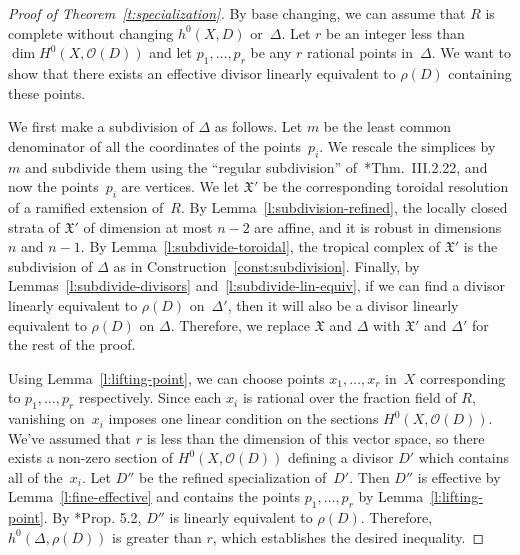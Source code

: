 \documentclass[11pt]{amsart}
\theoremstyle{definition}
\newcommand{\X}{\mathfrak X}
\begin{document}
\begin{proof}[Proof of Theorem~\ref{t:specialization}]
By base changing, we can assume that $R$ is complete without changing
$h^0(X, D)$ or~$\Delta$. Let $r$ be an integer less than $\dim
H^0(X, \mathcal O(D))$ and let $p_1, \ldots, p_r$ be any $r$ rational
points in~$\Delta$. We want to show that there exists an effective divisor
linearly equivalent to $\rho(D)$ containing these points.

We first make a subdivision of $\Delta$ as follows. Let $m$ be the least common
denominator of all the coordinates of the points~$p_i$. We rescale the simplices
by~$m$ and subdivide them using the ``regular subdivision''
of~\cite{kkmsd}*{Thm.~III.2.22}, and now the points~$p_i$ are vertices. We let
$\X'$ be the corresponding toroidal resolution of a ramified extension of~$R$.
By Lemma~\ref{l:subdivision-refined}, the locally closed strata of $\X'$ of
dimension at most $n-2$ are affine, and it is robust in dimensions $n$ and
$n-1$. By Lemma~\ref{l:subdivide-toroidal}, the tropical complex of $\X'$ is the
subdivision of $\Delta$ as in Construction~\ref{const:subdivision}. Finally, by
Lemmas~\ref{l:subdivide-divisors} and~\ref{l:subdivide-lin-equiv}, if we can
find a divisor linearly equivalent to $\rho(D)$ on~$\Delta'$, then it will also
be a divisor linearly equivalent to $\rho(D)$ on $\Delta$. Therefore, we replace
$\X$ and $\Delta$ with $\X'$ and $\Delta'$ for the rest of the proof.

Using Lemma~\ref{l:lifting-point}, we can choose points $x_1, \ldots, x_r$
in~$X$ corresponding to $p_1, \ldots, p_r$ respectively. Since each $x_i$ is
rational over the fraction field of $R$, vanishing on~$x_i$ imposes one linear
condition on the sections $H^0(X, \mathcal O(D))$. We've assumed that $r$ is
less than the dimension of this vector space, so there exists a non-zero section
of $H^0(X, \mathcal O(D))$ defining a divisor $D'$ which contains all of
the~$x_i$. Let $D''$ be the refined specialization of~$D'$. Then $D''$ is
effective by Lemma~\ref{l:fine-effective} and contains the points $p_1, \ldots,
p_r$ by Lemma~\ref{l:lifting-point}. By \cite{cartwright-complexes}*{Prop. 5.2},
$D''$ is linearly equivalent to $\rho(D)$. Therefore, $h^0(\Delta, \rho(D))$ is
greater than $r$, which establishes the desired inequality.
\end{proof}
\end{document}
